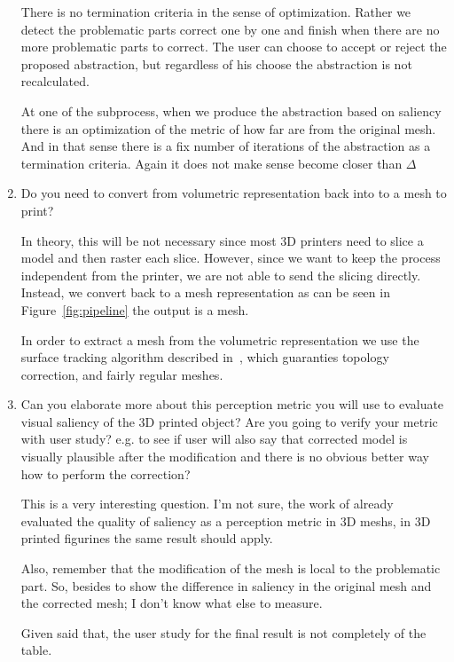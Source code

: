 \begin{enumerate}
	There is no termination criteria in the sense of optimization. Rather we detect the problematic parts correct one by one and finish when there are no more problematic parts to correct. The user can choose to accept or reject the proposed abstraction, but regardless of his choose the abstraction is not recalculated.
	
	At one of the subprocess, when we produce the abstraction based on saliency there is an optimization of the metric of how far are from the original mesh. And in that sense there is a fix number of iterations of the abstraction as a termination criteria. Again it does not make sense become closer than $\Delta$

  \item Do you need to convert from volumetric representation back into to a mesh to print?
	
	In theory, this will be not necessary since most 3D printers need to slice a model and then raster each slice. However, since we want to keep the process independent from the printer, we are not able to send the slicing directly. Instead, we convert back to a mesh representation as can be seen in Figure~\ref{fig:pipeline} the output is a mesh.
	
	In order to extract a mesh from the volumetric representation we use the surface tracking algorithm described in~\cite{Artzy1980}, which guaranties topology correction, and fairly regular meshes.
  
	\item Can you elaborate more about this perception metric you will use to evaluate visual saliency of the 3D printed object? Are you going to verify your metric with user study? e.g. to see if user will also say that corrected model is visually plausible after the modification and there is no obvious better way how to perform the correction?
	
	This is a very interesting question. I'm not sure, the work of already evaluated the quality of saliency as a perception metric in 3D meshs, in 3D printed figurines the same result should apply. 
	
	Also, remember that the modification of the mesh is local to the problematic part. So, besides to show the difference in saliency in the original mesh and the corrected mesh; I don't know what else to measure.
	
	Given said that, the user study for the final result is not completely of the table.
	

\end{enumerate}
